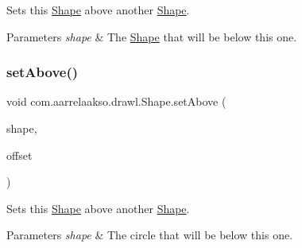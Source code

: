 Sets this \hyperlink{classcom_1_1aarrelaakso_1_1drawl_1_1_shape}{Shape} above another \hyperlink{classcom_1_1aarrelaakso_1_1drawl_1_1_shape}{Shape}. 


\begin{DoxyParams}{Parameters}
{\em shape} & The \hyperlink{classcom_1_1aarrelaakso_1_1drawl_1_1_shape}{Shape} that will be below this one. \\
\hline
\end{DoxyParams}
\mbox{\label{classcom_1_1aarrelaakso_1_1drawl_1_1_shape_aad0b2fb173c0112b71b06cf90709acc3}} 
\subsubsection{\texorpdfstring{set\+Above()}{setAbove()}\hspace{0.1cm}{\footnotesize\ttfamily [2/2]}}
{\footnotesize\ttfamily void com.\+aarrelaakso.\+drawl.\+Shape.\+set\+Above (\begin{DoxyParamCaption}\item[{@Not\+Null final \hyperlink{classcom_1_1aarrelaakso_1_1drawl_1_1_shape}{Shape}}]{shape,  }\item[{@Not\+Null final \hyperlink{classcom_1_1aarrelaakso_1_1drawl_1_1_measure}{Measure}}]{offset }\end{DoxyParamCaption})\hspace{0.3cm}{\ttfamily [inherited]}}



Sets this \hyperlink{classcom_1_1aarrelaakso_1_1drawl_1_1_shape}{Shape} above another \hyperlink{classcom_1_1aarrelaakso_1_1drawl_1_1_shape}{Shape}. 


\begin{DoxyParams}{Parameters}
{\em shape} & The circle that will be below this one. \\
\hline
\end{DoxyParams}
\mbox{\label{classcom_1_1aarrelaakso_1_1drawl_1_1_shape_a4147526667449f5beb534d4404ba8f77}} 
